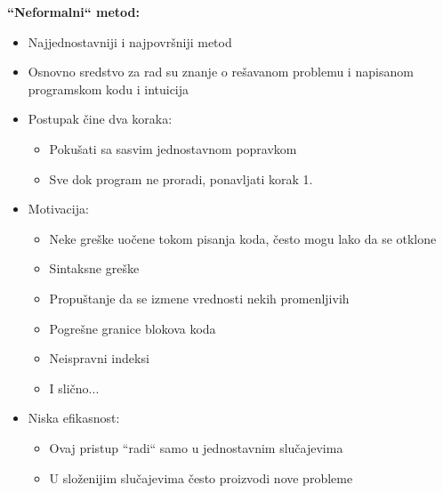 \documentclass[a4paper]{article}
\begin{document}
\item \textbf{``Neformalni`` metod:}
  \begin{itemize}
    \item Najjednostavniji i najpovršniji metod
    \item Osnovno sredstvo za rad su znanje o rešavanom problemu i napisanom programskom kodu i intuicija
    \item Postupak čine dva koraka:
      \begin{itemize}
        \item Pokušati sa sasvim jednostavnom popravkom
        \item Sve dok program ne proradi, ponavljati korak 1.
      \end{itemize}
  \item Motivacija:
	\begin{itemize}
      \item Neke greške uočene tokom pisanja koda, često mogu lako da se otklone
      \item Sintaksne greške
      \item Propuštanje da se izmene vrednosti nekih promenljivih
      \item Pogrešne granice blokova koda
      \item Neispravni indeksi
      \item I slično...
	\end{itemize}
  \item Niska efikasnost:
    \begin{itemize}
      \item Ovaj pristup ``radi`` samo u jednostavnim slučajevima
      \item U složenijim slučajevima često proizvodi nove probleme
    \end{itemize}
 \end{itemize}
\end{document}
